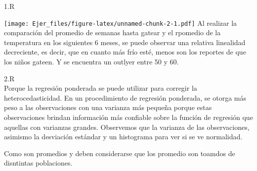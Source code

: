 \documentclass[
]{article}
\newenvironment{Shaded}{\begin{snugshade}}{\end{snugshade}}
\newcommand{\AttributeTok}[1]{\textcolor[rgb]{0.77,0.63,0.00}{#1}}
\newcommand{\CommentTok}[1]{\textcolor[rgb]{0.56,0.35,0.01}{\textit{#1}}}
\newcommand{\DecValTok}[1]{\textcolor[rgb]{0.00,0.00,0.81}{#1}}
\newcommand{\FunctionTok}[1]{\textcolor[rgb]{0.00,0.00,0.00}{#1}}
\newcommand{\NormalTok}[1]{#1}
\newcommand{\OtherTok}[1]{\textcolor[rgb]{0.56,0.35,0.01}{#1}}
\newcommand{\SpecialCharTok}[1]{\textcolor[rgb]{0.00,0.00,0.00}{#1}}
\newcommand{\StringTok}[1]{\textcolor[rgb]{0.31,0.60,0.02}{#1}}
\begin{document}
1.R\\

\begin{Shaded}
\end{Shaded}

\texttt{[image: Ejer\_files/figure-latex/unnamed-chunk-2-1.pdf]} Al
realizar la comparación del promedio de semanas hasta gatear y el
rpomedio de la temperatura en los siguientes 6 meses, se puede observar
una relativa linealidad decreciente, es decir, que en cuanto más frío
esté, menos son los reportes de que los niños gateen. Y se encuentra un
outlyer entre 50 y 60.

2.R\\

Porque la regresión ponderada se puede utilizar para corregir la
heterocedasticidad. En un procedimiento de regresión ponderada, se
otorga más peso a las observaciones con una varianza más pequeña porque
estas observaciones brindan información más confiable sobre la función
de regresión que aquellas con varianzas grandes. Observemos que la
varianza de las observaciones, asimismo la desviación estándar y un
histograma para ver si se ve normalidad.

Como son promedios y deben considerarse que los promedio son toamdos de
disntintas poblaciones.
\end{document}

